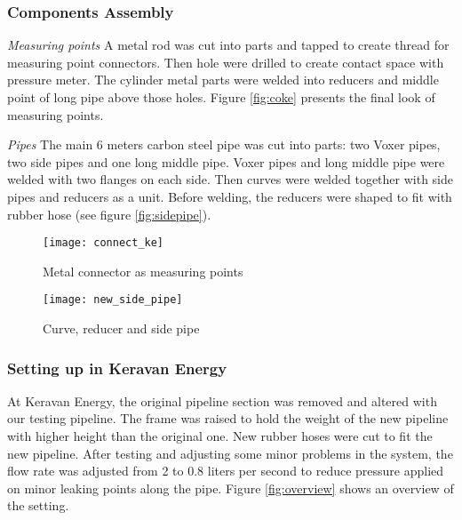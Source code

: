 \subsubsection{Components Assembly}

\textit{Measuring points}\newline
A metal rod was cut into parts and tapped to create thread for measuring point connectors. Then hole were drilled to create contact space with pressure meter. The cylinder metal parts were welded into reducers and middle point of long pipe above those holes. Figure \vref{fig:coke} presents the final look of measuring points.

\textit{Pipes}\newline
The main 6 meters carbon steel pipe was cut into parts: two Voxer pipes, two side pipes and one long middle pipe. Voxer pipes and long middle pipe were welded with two flanges on each side. Then curves were welded together with side pipes and reducers as a unit. Before welding, the reducers were shaped to fit with rubber hose (see figure \vref{fig:sidepipe}).

\begin{figure}[!htb]
   \begin{minipage}{0.48\textwidth}
     \centering
     \texttt{[image: connect\_ke]}
     \caption{Metal connector as measuring points}\label{fig:coke}
   \end{minipage}\hfill
   \begin {minipage}{0.48\textwidth}
     \centering
     \texttt{[image: new\_side\_pipe]}
     \caption{Curve, reducer and side pipe}\label{fig:sidepipe}
   \end{minipage}
\end{figure}

\subsubsection{Setting up in Keravan Energy}

At Keravan Energy, the original pipeline section was removed and altered with our testing pipeline. The frame was raised to hold the weight of the new pipeline with higher height than the original one. New rubber hoses were cut to fit the new pipeline. After testing and adjusting some minor problems in the system, the flow rate was adjusted from 2 to 0.8 liters per second to reduce pressure applied on minor leaking points along the pipe. Figure \vref{fig:overview} shows an overview of the setting.

